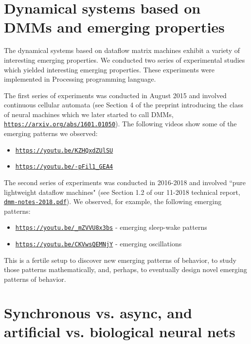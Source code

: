 \documentclass{article}
\begin{document}
\section{Dynamical systems based on DMMs and emerging properties}

The dynamical systems based on dataflow
matrix machines exhibit a variety of interesting emerging properties. We conducted two series of experimental studies which yielded interesting emerging properties. These experiments were implemented in Processing programming language.

The first series of experiments was conducted in August 2015 and involved continuous cellular automata (see Section 4 of the preprint introducing the class of neural machines which we later started to call DMMs, \href{https://arxiv.org/abs/1601.01050}{\tt https://arxiv.org/abs/1601.01050}). The following videos show some of the emerging patterns we observed:

\begin{itemize}
   \item \href{https://youtu.be/KZHQxdZUlSU}{\tt https://youtu.be/KZHQxdZUlSU}
   \item \href{https://youtu.be/-pFil1\_GEA4}{\tt https://youtu.be/-pFil1\_GEA4}
\end{itemize}

The second series of experiments was conducted in 2016-2018 and involved ``pure lightweight dataflow machines" (see Section 1.2 of our 11-2018 technical report, 
\href{https://www.cs.brandeis.edu/~bukatin/dmm-notes-2018.pdf}{\tt dmm-notes-2018.pdf}).
We observed, for example, the following emerging patterns:

\begin{itemize}
   \item \href{https://youtu.be/\_mZVVU8x3bs}{\tt https://youtu.be/\_mZVVU8x3bs} - emerging sleep-wake patterns
   \item \href{https://youtu.be/CKVwsQEMNjY}{\tt https://youtu.be/CKVwsQEMNjY} - emerging oscillations
\end{itemize}

This is a fertile setup to discover new emerging patterns of behavior, to study those patterns mathematically,
and, perhaps, to eventually design novel emerging patterns of behavior.

\section{Synchronous vs. async, and artificial vs. biological neural nets}
\end{document}

